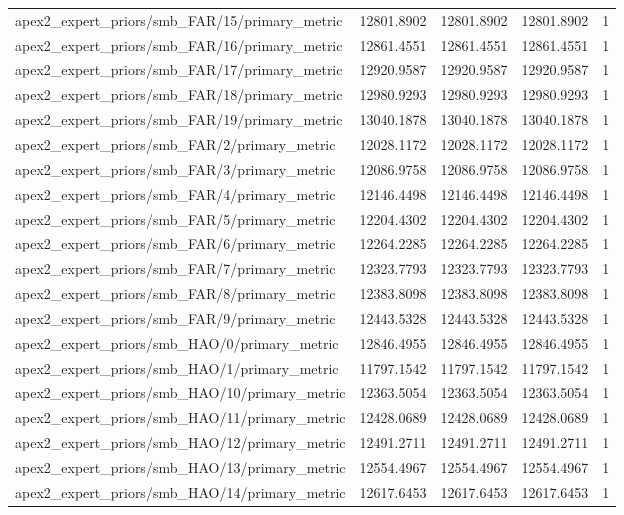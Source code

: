 \begin{table}[h]
\begin{tabular}{lrrrr}
apex2_expert_priors/smb_FAR/15/primary_metric & 12801.8902 & 12801.8902 & 12801.8902 & 1 \\
apex2_expert_priors/smb_FAR/16/primary_metric & 12861.4551 & 12861.4551 & 12861.4551 & 1 \\
apex2_expert_priors/smb_FAR/17/primary_metric & 12920.9587 & 12920.9587 & 12920.9587 & 1 \\
apex2_expert_priors/smb_FAR/18/primary_metric & 12980.9293 & 12980.9293 & 12980.9293 & 1 \\
apex2_expert_priors/smb_FAR/19/primary_metric & 13040.1878 & 13040.1878 & 13040.1878 & 1 \\
apex2_expert_priors/smb_FAR/2/primary_metric & 12028.1172 & 12028.1172 & 12028.1172 & 1 \\
apex2_expert_priors/smb_FAR/3/primary_metric & 12086.9758 & 12086.9758 & 12086.9758 & 1 \\
apex2_expert_priors/smb_FAR/4/primary_metric & 12146.4498 & 12146.4498 & 12146.4498 & 1 \\
apex2_expert_priors/smb_FAR/5/primary_metric & 12204.4302 & 12204.4302 & 12204.4302 & 1 \\
apex2_expert_priors/smb_FAR/6/primary_metric & 12264.2285 & 12264.2285 & 12264.2285 & 1 \\
apex2_expert_priors/smb_FAR/7/primary_metric & 12323.7793 & 12323.7793 & 12323.7793 & 1 \\
apex2_expert_priors/smb_FAR/8/primary_metric & 12383.8098 & 12383.8098 & 12383.8098 & 1 \\
apex2_expert_priors/smb_FAR/9/primary_metric & 12443.5328 & 12443.5328 & 12443.5328 & 1 \\
apex2_expert_priors/smb_HAO/0/primary_metric & 12846.4955 & 12846.4955 & 12846.4955 & 1 \\
apex2_expert_priors/smb_HAO/1/primary_metric & 11797.1542 & 11797.1542 & 11797.1542 & 1 \\
apex2_expert_priors/smb_HAO/10/primary_metric & 12363.5054 & 12363.5054 & 12363.5054 & 1 \\
apex2_expert_priors/smb_HAO/11/primary_metric & 12428.0689 & 12428.0689 & 12428.0689 & 1 \\
apex2_expert_priors/smb_HAO/12/primary_metric & 12491.2711 & 12491.2711 & 12491.2711 & 1 \\
apex2_expert_priors/smb_HAO/13/primary_metric & 12554.4967 & 12554.4967 & 12554.4967 & 1 \\
apex2_expert_priors/smb_HAO/14/primary_metric & 12617.6453 & 12617.6453 & 12617.6453 & 1 \\

\end{tabular}
\end{table}
